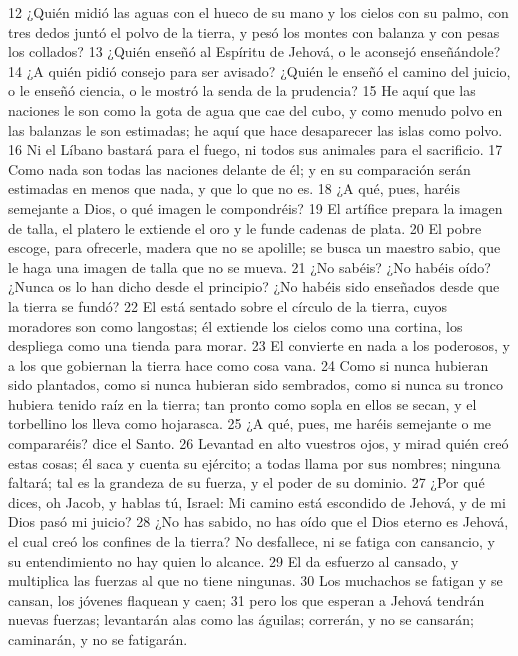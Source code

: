 12 ¿Quién midió las aguas con el hueco de su mano y los cielos con su palmo, con tres dedos juntó el polvo de la tierra, y pesó los montes con balanza y con pesas los collados?
13 ¿Quién enseñó al Espíritu de Jehová, o le aconsejó enseñándole? 
14 ¿A quién pidió consejo para ser avisado? ¿Quién le enseñó el camino del juicio, o le enseñó ciencia, o le mostró la senda de la prudencia?
15 He aquí que las naciones le son como la gota de agua que cae del cubo, y como menudo polvo en las balanzas le son estimadas; he aquí que hace desaparecer las islas como polvo.
16 Ni el Líbano bastará para el fuego, ni todos sus animales para el sacrificio.
17 Como nada son todas las naciones delante de él; y en su comparación serán estimadas en menos que nada, y que lo que no es.
18 ¿A qué, pues, haréis semejante a Dios, o qué imagen le compondréis?
19 El artífice prepara la imagen de talla, el platero le extiende el oro y le funde cadenas de plata.
20 El pobre escoge, para ofrecerle, madera que no se apolille; se busca un maestro sabio, que le haga una imagen de talla que no se mueva.
21 ¿No sabéis? ¿No habéis oído? ¿Nunca os lo han dicho desde el principio? ¿No habéis sido enseñados desde que la tierra se fundó?
22 El está sentado sobre el círculo de la tierra, cuyos moradores son como langostas; él extiende los cielos como una cortina, los despliega como una tienda para morar.
23 El convierte en nada a los poderosos, y a los que gobiernan la tierra hace como cosa vana.
24 Como si nunca hubieran sido plantados, como si nunca hubieran sido sembrados, como si nunca su tronco hubiera tenido raíz en la tierra; tan pronto como sopla en ellos se secan, y el torbellino los lleva como hojarasca.
25 ¿A qué, pues, me haréis semejante o me compararéis? dice el Santo.
26 Levantad en alto vuestros ojos, y mirad quién creó estas cosas; él saca y cuenta su ejército; a todas llama por sus nombres; ninguna faltará; tal es la grandeza de su fuerza, y el poder de su dominio.
27 ¿Por qué dices, oh Jacob, y hablas tú, Israel: Mi camino está escondido de Jehová, y de mi Dios pasó mi juicio?
28 ¿No has sabido, no has oído que el Dios eterno es Jehová, el cual creó los confines de la tierra? No desfallece, ni se fatiga con cansancio, y su entendimiento no hay quien lo alcance.
29 El da esfuerzo al cansado, y multiplica las fuerzas al que no tiene ningunas.
30 Los muchachos se fatigan y se cansan, los jóvenes flaquean y caen;
31 pero los que esperan a Jehová tendrán nuevas fuerzas; levantarán alas como las águilas; correrán, y no se cansarán; caminarán, y no se fatigarán.

